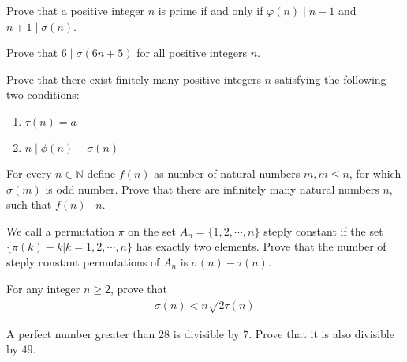 \begin{problem} %
	Prove that a positive integer $n$ is prime if and only if $\varphi(n)\mid n-1$ and $n+1\mid\sigma(n)$.
\end{problem}

\begin{problem} %
	Prove that $6\mid \sigma(6n+5)$ for all positive integers $n$.
\end{problem}

\begin{problem} %
	Prove that there exist finitely many positive integers $n$ satisfying the following two conditions:
		\begin{enumerate}
			\item $\tau (n)=a$
			\item $n\mid \phi (n)+\sigma (n)$
		\end{enumerate}
\end{problem}

\begin{problem} %
	For every $n\in \mathbb{N}$ define $f(n)$ as number of natural numbers $m, m\leq n$, for which $\sigma(m)$ is odd number. Prove that there are infinitely many natural numbers $n$, such that $f(n)\mid n$.
\end{problem}

\begin{problem} %
	We call a permutation $\pi$ on the set $A_n=\{1,2,\cdots,n\}$ steply constant if the set $\{\pi (k)-k|k=1,2,\cdots,n\}$ has exactly two elements. Prove that the number of steply constant permutations of $A_n$ is $\sigma(n)-\tau (n)$.
\end{problem}

\begin{problem}[Belarus 1999] %
	For any integer $n\ge 2$, prove that
		\begin{align*}
			\sigma (n)<n\sqrt{2\tau (n)}
		\end{align*}
\end{problem}

\begin{problem} %
	A perfect number greater than $28$ is divisible by $7$. Prove that it is also divisible by $49$.
\end{problem}

